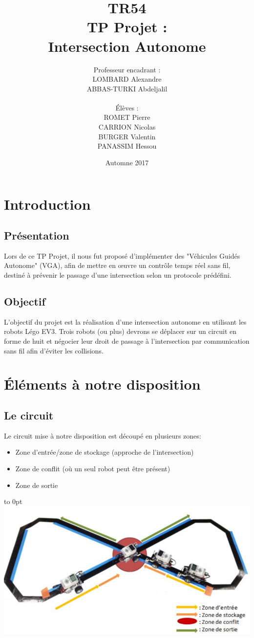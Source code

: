 \documentclass[french,a4paper,12pt]{report}
\title{TR54 \\ TP Projet :\\ Intersection Autonome}
\author{Professeur encadrant :\\LOMBARD Alexandre \\ ABBAS-TURKI Abdeljalil\\\\ Élèves :\\ROMET Pierre\\CARRION Nicolas\\BURGER Valentin\\PANASSIM Hessou}
\date{Automne 2017}
\begin{document}
\maketitle

\tableofcontents

\part{Introduction}
\chapter{Présentation}
Lors de ce TP Projet,
il nous fut proposé d'implémenter des "Véhicules Guidés Autonome" (VGA), afin de mettre en œuvre un contrôle
temps réel sans fil, destiné à prévenir le passage d'une intersection selon un protocole prédéfini.

\chapter{Objectif}
L'objectif du projet est la réalisation d'une intersection autonome en utilisant les robots Légo EV3.
Trois robots (ou plus) devrons se déplacer sur un circuit en forme de huit et négocier leur droit de passage à
l'intersection par communication sans fil afin d'éviter les collisions.

\part{Éléments à notre disposition}

\chapter{Le circuit}
Le circuit mise à notre disposition est découpé en plusieurs zones:
\begin{itemize}
\item Zone d’entrée/zone de stockage (approche de l’intersection)
\item Zone de conflit (où un seul robot peut être présent)
\item Zone de sortie
\end{itemize}

\hfill\hbox to 0pt{\hss\includegraphics[width=15cm]{circuit.png}\hss}\hfill\null\newline
\end{document}
